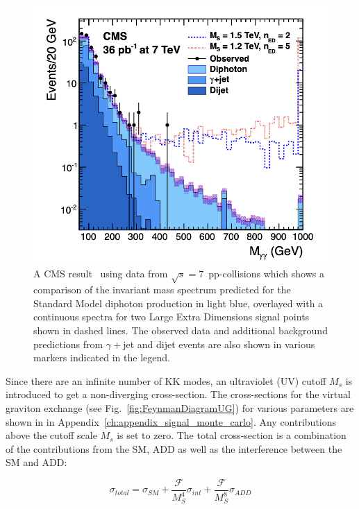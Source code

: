 \begin{figure}[ht]
    \centering
    \includegraphics[scale=0.6]{fig/InvariantMass.png}
    \caption{A CMS result~\cite{CMS:2011uvc} using data from $\sqrt{s} = 7$~\TeV pp-collisions which shows a comparison of the invariant mass spectrum predicted for the Standard Model diphoton production in light blue, overlayed with a continuous spectra for two Large Extra Dimensions signal points shown in dashed lines. The observed data and additional background predictions from $\gamma+$jet and dijet events are also shown in various markers indicated in the legend.}
    \label{fig:CMSModelDiphotonInvMass}
\end{figure}


Since there are an infinite number of KK modes, an ultraviolet (UV) cutoff $M_s$ is introduced to get a non-diverging cross-section. The cross-sections for the virtual graviton exchange (see Fig.~\ref{fig:FeynmanDiagramUG}) for various parameters are shown in in Appendix~\ref{ch:appendix_signal_monte_carlo}. Any contributions above the cutoff scale $M_s$ is set to zero. The total cross-section is a combination of the contributions from the SM, ADD as well as the interference between the SM and ADD:

\begin{equation}
\sigma_{total} = \sigma_{SM} + \frac{\mathcal{F}}{M^4_{S}} \sigma_{int}+\frac{\mathcal{F}}{M^8_{S}} \sigma_{ADD} 
\label{eq:totalADDxsec}
\end{equation}

